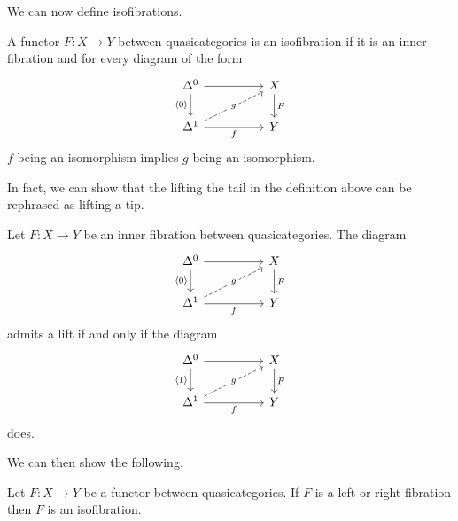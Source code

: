 We can now define isofibrations. 
\begin{definition}\label{def: isofibration}
    A functor $F:X\to Y$ between quasicategories is an isofibration if it is an inner fibration and for every diagram of the form
    $$%
    \begin{tikzcd}
        {\Delta^{0}} && X \\
        {\Delta^{1}} && Y
        \arrow["F", from=1-3, to=2-3]
        \arrow[from=1-1, to=1-3]
        \arrow["f"', from=2-1, to=2-3]
        \arrow["\langle0\rangle"', from=1-1, to=2-1]
        \arrow["g"{description}, dashed, from=2-1, to=1-3]
    \end{tikzcd}$$
    $f$ being an isomorphism implies $g$ being an isomorphism. 
\end{definition}
In fact, we can show that the lifting the tail in the definition above can be rephrased as lifting a tip. 
\begin{lemma}
    Let $F:X\to Y$ be an inner fibration between quasicategories. The diagram 
    $$%
    \begin{tikzcd}
        {\Delta^{0}} && X \\
        {\Delta^{1}} && Y
        \arrow["F", from=1-3, to=2-3]
        \arrow[from=1-1, to=1-3]
        \arrow["f"', from=2-1, to=2-3]
        \arrow["\langle0\rangle"', from=1-1, to=2-1]
        \arrow["g"{description}, dashed, from=2-1, to=1-3]
    \end{tikzcd}$$
    admits a lift if and only if the diagram 
    $$%
    \begin{tikzcd}
        {\Delta^{0}} && X \\
        {\Delta^{1}} && Y
        \arrow["F", from=1-3, to=2-3]
        \arrow[from=1-1, to=1-3]
        \arrow["f"', from=2-1, to=2-3]
        \arrow["\langle1\rangle"', from=1-1, to=2-1]
        \arrow["g"{description}, dashed, from=2-1, to=1-3]
    \end{tikzcd}$$
    does. 
\end{lemma}
We can then show the following. 
\begin{proposition}
    Let $F:X\to Y$ be a functor between quasicategories. If $F$ is a left or right fibration then $F$ is an isofibration. 
\end{proposition}